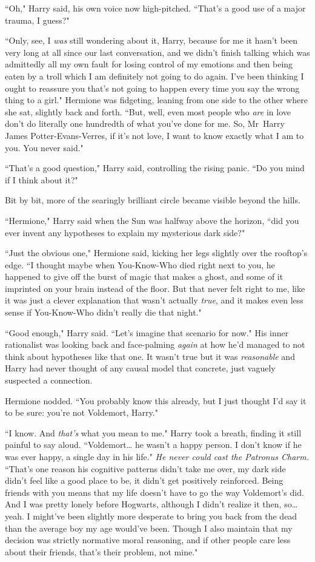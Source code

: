 ``Oh," Harry said, his own voice now high-pitched. ``That's a good use of a major trauma, I guess?"

``Only, see, I \emph{was} still wondering about it, Harry, because for me it hasn't been very long at all since our last conversation, and we didn't finish talking which was admittedly all my own fault for losing control of my emotions and then being eaten by a troll which I am definitely not going to do again. I've been thinking I ought to reassure you that's not going to happen every time you say the wrong thing to a girl." Hermione was fidgeting, leaning from one side to the other where she sat, slightly back and forth. ``But, well, even most people who \emph{are} in love don't do literally one hundredth of what you've done for me. So, Mr~Harry James Potter-Evans-Verres, if it's not love, I want to know exactly what I am to you. You never said."

``That's a good question," Harry said, controlling the rising panic. ``Do you mind if I think about it?"

Bit by bit, more of the searingly brilliant circle became visible beyond the hills.

``Hermione," Harry said when the Sun was halfway above the horizon, ``did you ever invent any hypotheses to explain my mysterious dark side?"

``Just the obvious one," Hermione said, kicking her legs slightly over the rooftop's edge. ``I thought maybe when You-Know-Who died right next to you, he happened to give off the burst of magic that makes a ghost, and some of it imprinted on your brain instead of the floor. But that never felt right to me, like it was just a clever explanation that wasn't actually \emph{true}, and it makes even less sense if You-Know-Who didn't really die that night."

``Good enough," Harry said. ``Let's imagine that scenario for now." His inner rationalist was looking back and face-palming \emph{again} at how he'd managed to not think about hypotheses like that one. It wasn't true but it was \emph{reasonable} and Harry had never thought of any causal model that concrete, just vaguely suspected a connection.

Hermione nodded. ``You probably know this already, but I just thought I'd say it to be sure: you're not Voldemort, Harry."

``I know. And \emph{that's} what you mean to me." Harry took a breath, finding it still painful to say aloud. ``Voldemort{\ldots} he wasn't a happy person. I don't know if he was ever happy, a single day in his life." \emph{He never could cast the Patronus Charm.} ``That's one reason his cognitive patterns didn't take me over, my dark side didn't feel like a good place to be, it didn't get positively reinforced. Being friends with you means that my life doesn't have to go the way Voldemort's did. And I was pretty lonely before Hogwarts, although I didn't realize it then, so{\ldots} yeah. I might've been slightly more desperate to bring you back from the dead than the average boy my age would've been. Though I also maintain that my decision was strictly normative moral reasoning, and if other people care less about their friends, that's their problem, not mine."

